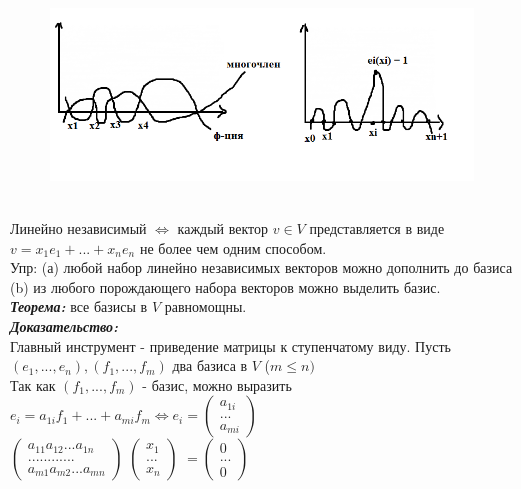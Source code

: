 \documentclass[12pt, oneside]{book}
\theoremstyle{definition}
\renewcommand{\leq}{\leqslant}
\begin{document}
\begin{enumerate}
\begin{figure}[h!]
\centering
\includegraphics[scale=0.6]{7-1.PNG}
\end{figure}\\
Линейно независимый $\Leftrightarrow$ каждый вектор $v \in V$ представляется в виде $v = x_1 e_1 + ... + x_n e_n$ не более чем одним способом.\\
Упр: (а) любой набор линейно независимых векторов можно дополнить до базиса\\
(b) из любого порождающего набора векторов можно выделить базис.\\
\textit{\textbf{Теорема:}} все базисы в $V$ равномощны. \\
\textit{\textbf{Доказательство:}}\\
Главный инструмент - приведение матрицы к ступенчатому виду.
Пусть $(e_1, ... , e_n), (f_1, ... , f_m)$ два базиса в $V$ ($m \leq n)$\\
Так как $(f_1, ... , f_m)$ - базис, можно выразить $e_i = a_{1i} f_1 + ... + a_{mi} f_m \Leftrightarrow 
e_i = 
\begin{pmatrix}
    a_{1i}\\
    ... \\
    a_{mi}
\end{pmatrix}$ \\
$\begin{pmatrix}
    a_{11} a_{12} ... a_{1n}\\
    ... ... ... ... \\
    a_{m1} a_{m2} ... a_{mn}
\end{pmatrix}$
$\begin{pmatrix}
    x_1 \\
    ... \\
    x_n
\end{pmatrix}$
$=
\begin{pmatrix}
    0 \\
    ... \\
    0
\end{pmatrix}$\\

\end{enumerate}
\end{document}
